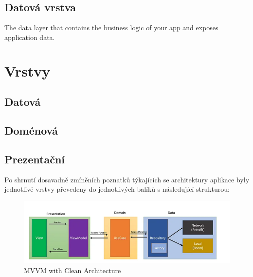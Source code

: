 \subsection*{Datová vrstva}
The data layer that contains the business logic of your app and exposes application data.


\section{Vrstvy}
\subsection{Datová}
\subsection{Doménová}
\subsection{Prezentační}


Po shrnutí dosavadně zmíněních poznatků týkajících se architektury aplikace byly jednotlivé vrstvy převedeny do jednotlivých balíků s následující
strukturou:




\begin{figure}[H]
  \centering
  \includegraphics[width=1\textwidth]{mvvm.png}
  \caption{MVVM with Clean Architecture}
  \label{fig:mvvm}
\end{figure}

